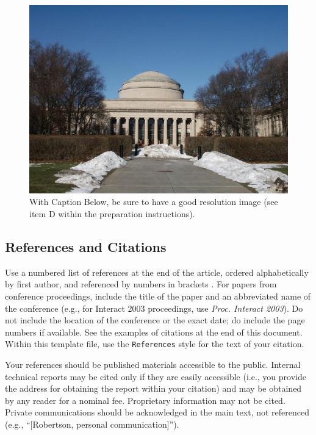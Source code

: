 \documentclass{sigchi}
\begin{document}
\begin{figure}[!h]
\centering
\includegraphics[width=0.9\columnwidth]{Figure1}
\caption{With Caption Below, be sure to have a good resolution image
  (see item D within the preparation instructions).}
\label{fig:figure1}
\end{figure}

\subsection{References and Citations}

Use a numbered list of references at the end of the article, ordered
alphabetically by first author, and referenced by numbers in brackets
\cite{ethics,
  Klemmer:2002:WSC:503376.503378,
  Mather:2000:MUT,
  Zellweger:2001:FAO:504216.504224}. For
papers from conference proceedings, include the title of the paper and
an abbreviated name of the conference (e.g., for Interact 2003
proceedings, use \textit{Proc. Interact 2003}). Do not include the
location of the conference or the exact date; do include the page
numbers if available. See the examples of citations at the end of this
document. Within this template file, use the \texttt{References} style
for the text of your citation.

Your references should be published materials accessible to the
public.  Internal technical reports may be cited only if they are
easily accessible (i.e., you provide the address for obtaining the
report within your citation) and may be obtained by any reader for a
nominal fee.  Proprietary information may not be cited. Private
communications should be acknowledged in the main text, not referenced
(e.g., ``[Robertson, personal communication]'').
\end{document}
